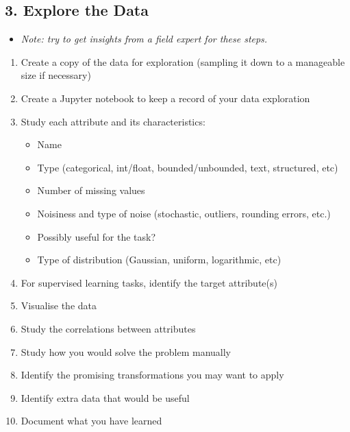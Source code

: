 \begin{slide}
  \section[-2]{3. Explore the Data}

\begin{PauseHighLight}
  \begin{itemize}\squeeze
  \item \emph{Note: try to get insights from a field expert for these
      steps.}\pause
  \end{itemize}
  \begin{enumerate}\squeeze
  \item Create a copy of the data for exploration (sampling it down to
    a manageable size if necessary)\pause
  \item Create a Jupyter notebook to keep a record of your data
    exploration\pause
  \item Study each attribute and its characteristics:
    \begin{itemize}
    \item Name
    \item Type (categorical, int/float, bounded/unbounded, text,
      structured, etc)
    \item Number of missing values
    \item Noisiness and type of noise (stochastic, outliers, rounding
      errors, etc.)\pause
    \item Possibly useful for the task?
    \item Type of distribution (Gaussian, uniform, logarithmic, etc)\pause
    \end{itemize}
  \item For supervised learning tasks, identify the target
    attribute(s)\pause
  \item Visualise the data\pause
  \item Study the correlations between attributes\pause
  \item Study how you would solve the problem manually\pause
  \item Identify the promising transformations you may want to
    apply\pause
  \item Identify extra data that would be useful\pause
  \item Document what you have learned\pause
  \end{enumerate}
\end{PauseHighLight}

\end{slide}

